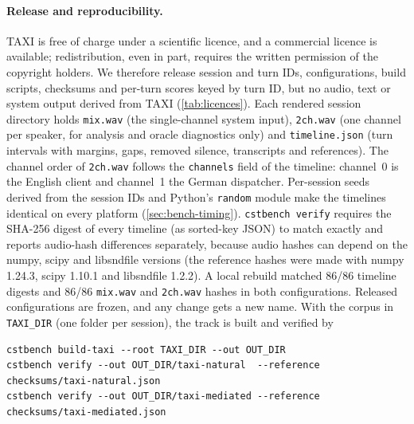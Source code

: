 \paragraph{Release and reproducibility.}
TAXI is free of charge under a scientific licence, and a commercial licence is available; redistribution, even in part, requires the written permission of the copyright holders. We therefore release session and turn IDs, configurations, build scripts, checksums and per-turn scores keyed by turn ID, but no audio, text or system output derived from TAXI (\cref{tab:licences}). Each rendered session directory holds \texttt{mix.wav} (the single-channel system input), \texttt{2ch.wav} (one channel per speaker, for analysis and oracle diagnostics only) and \texttt{timeline.json} (turn intervals with margins, gaps, removed silence, transcripts and references). The channel order of \texttt{2ch.wav} follows the \texttt{channels} field of the timeline: channel~0 is the English client and channel~1 the German dispatcher.
Per-session seeds derived from the session IDs and Python's \texttt{random} module make the timelines identical on every platform (\cref{sec:bench-timing}). \texttt{cstbench verify} requires the SHA-256 digest of every timeline (as sorted-key JSON) to match exactly and reports audio-hash differences separately, because audio hashes can depend on the numpy, scipy and libsndfile versions (the reference hashes were made with numpy 1.24.3, scipy 1.10.1 and libsndfile 1.2.2). A local rebuild matched 86/86 timeline digests and 86/86 \texttt{mix.wav} and \texttt{2ch.wav} hashes in both configurations. Released configurations are frozen, and any change gets a new name. With the corpus in \texttt{TAXI\_DIR} (one folder per session), the track is built and verified by
{\small
\begin{verbatim}
cstbench build-taxi --root TAXI_DIR --out OUT_DIR
cstbench verify --out OUT_DIR/taxi-natural  --reference checksums/taxi-natural.json
cstbench verify --out OUT_DIR/taxi-mediated --reference checksums/taxi-mediated.json
\end{verbatim}
}

